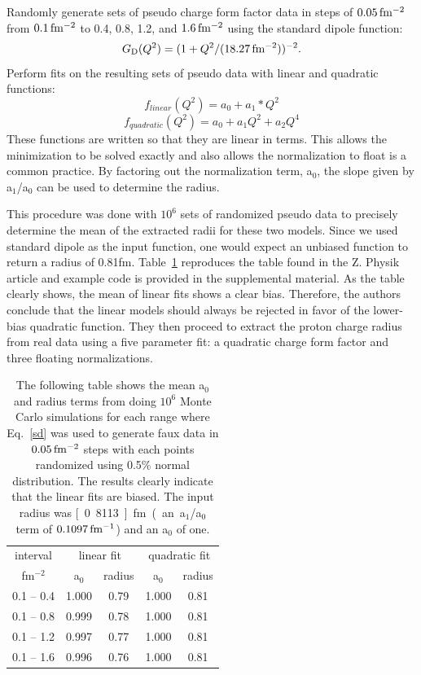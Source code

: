 \documentclass[10pt,aps,prc,twocolumn]{revtex4-1}
\begin{document}
Randomly generate sets of pseudo charge form factor data in steps of $\unit[0.05]{fm^{-2}}$ from $\unit[0.1]{fm^{-2}}$ to 0.4, 0.8, 1.2,
and $\unit[1.6]{fm^{-2}}$ using the standard dipole function:
\begin{equation}
\label{sd}
G\mathrm{_D}(Q^2) = ( 1 + Q^2/(\unit[18.27]{fm^{-2}}))^{-2}.
\end{equation}
Perform fits on the resulting sets of pseudo data with linear and quadratic functions:
\begin{equation}
f_{linear}(Q^2) = a_0 + a_1 * Q^2
\end{equation}
\begin{equation}
f_{quadratic}(Q^2) = a_0 + a_1 Q^2 + a_2 Q^4 
\end{equation}
These functions are written so that they are linear in terms.  This allows the minimization to be solved exactly
and also allows the normalization to float is a common practice.   By factoring out the normalization term, a$_0$, 
the slope given by a$_1$/a$_0$ can be used to determine the radius.

This procedure was done with $10^6$ sets of randomized pseudo data to precisely determine the mean of the extracted 
radii for these two models.   Since we used standard dipole as the input function, one would expect an unbiased 
function to return a radius of 0.81fm.
Table~\ref{ztable} reproduces the table found in the
Z. Physik article and example code is provided in the supplemental material.
As the table clearly shows, the mean of linear fits shows a clear bias. 
Therefore, the authors conclude that the linear models should always be rejected in favor of the lower-bias quadratic function.
They then proceed to extract the proton charge radius from real data using a five parameter fit: a quadratic charge form factor 
and three floating normalizations.

\begin{table}
\caption{The following table shows the mean a$_0$ and radius terms from doing $10^6$ Monte Carlo simulations
for each range
where Eq.~\ref{sd} was used to generate faux data in $\unit[0.05]{fm^{-2}}$ steps with each points randomized using
0.5\% normal distribution.   The results clearly indicate that the linear fits are biased.   The input
radius was \unit[0.8113]{fm} (an a$_1$/a$_0$ term of $\unit[0.1097]{fm^{-1}}$) and an a$_0$ of one.}
\begin{tabular}{c|cc|cc} \hline
interval       & \multicolumn{2}{c|}{linear fit} & \multicolumn{2}{c}{quadratic fit}  \\
fm$^{-2}$      & a$_0$      & radius          & a$_0$    & radius \\ \hline
 0.1 -- 0.4 & 1.000& 0.79& 1.000& 0.81 \\
 0.1 -- 0.8 & 0.999& 0.78& 1.000& 0.81 \\
 0.1 -- 1.2 & 0.997& 0.77& 1.000& 0.81 \\
 0.1 -- 1.6 & 0.996& 0.76& 1.000& 0.81 \\ \hline
\end{tabular}
\label{ztable}
\end{table}
\end{document}
